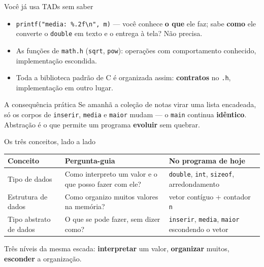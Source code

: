 \documentclass[aspectratio=169]{beamer}
\begin{document}
\begin{frame}{Você já usa TADs sem saber}
  \begin{itemize}
    \item \texttt{printf("media: \%.2f\textbackslash n", m)} --- você conhece
      \textbf{o que} ele faz; sabe \textbf{como} ele converte o
      \texttt{double} em texto e o entrega à tela? Não precisa.
    \item As funções de \texttt{math.h} (\texttt{sqrt}, \texttt{pow}):
      operações com comportamento conhecido, implementação escondida.
    \item Toda a biblioteca padrão de C é organizada assim: \textbf{contratos}
      no \texttt{.h}, implementação em outro lugar.
  \end{itemize}
  \begin{exampleblock}{A consequência prática}
    Se amanhã a coleção de notas virar uma lista encadeada, só os corpos de
    \texttt{inserir}, \texttt{media} e \texttt{maior} mudam --- o
    \texttt{main} continua \textbf{idêntico}. Abstração é o que permite um
    programa \textbf{evoluir} sem quebrar.
  \end{exampleblock}
\end{frame}

\begin{frame}{Os três conceitos, lado a lado}
  \begin{center}
  \begin{tabular}{p{3.1cm}p{4.6cm}p{4.6cm}}
    \toprule
    Conceito & Pergunta-guia & No programa de hoje \\
    \midrule
    Tipo de dados &
    Como interpreto um valor e o que posso fazer com ele? &
    \texttt{double}, \texttt{int}, \texttt{sizeof}, arredondamento \\[6pt]
    Estrutura de dados &
    Como organizo muitos valores na memória? &
    vetor contíguo + contador \texttt{n} \\[6pt]
    Tipo abstrato de dados &
    O que se pode fazer, sem dizer como? &
    \texttt{inserir}, \texttt{media}, \texttt{maior} escondendo o vetor \\
    \bottomrule
  \end{tabular}
  \end{center}
  \vspace{0.5em}
  \begin{center}
    Três níveis da mesma escada: \textbf{interpretar} um valor,
    \textbf{organizar} muitos, \textbf{esconder} a organização.
  \end{center}
\end{frame}
\end{document}
